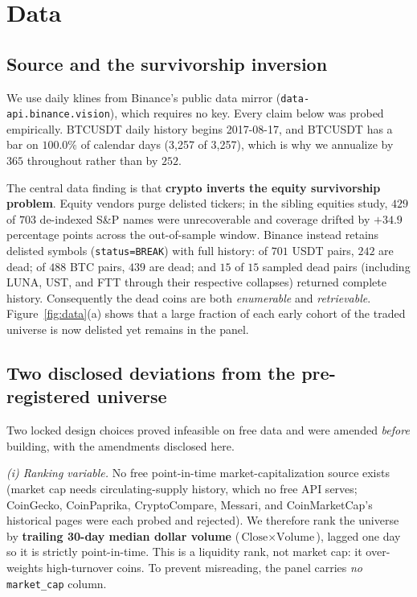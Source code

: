 \documentclass[11pt]{article}
\begin{document}
\section{Data}

\subsection{Source and the survivorship inversion}
We use daily klines from Binance's public data mirror (\texttt{data-api.binance.vision}), which
requires no key. Every claim below was probed empirically. BTCUSDT daily history begins
2017-08-17, and BTCUSDT has a bar on $100.0\%$ of calendar days (3{,}257 of 3{,}257), which is why
we annualize by $365$ throughout rather than by $252$.

The central data finding is that \textbf{crypto inverts the equity survivorship problem}. Equity
vendors purge delisted tickers; in the sibling equities study, $429$ of $703$ de-indexed S\&P names
were unrecoverable and coverage drifted by $+34.9$ percentage points across the out-of-sample
window. Binance instead retains delisted symbols (\texttt{status=BREAK}) with full history: of $701$
USDT pairs, $242$ are dead; of $488$ BTC pairs, $439$ are dead; and $15$ of $15$ sampled dead pairs
(including LUNA, UST, and FTT through their respective collapses) returned complete history.
Consequently the dead coins are both \emph{enumerable} and \emph{retrievable}.
Figure~\ref{fig:data}(a) shows that a large fraction of each early cohort of the traded universe is
now delisted yet remains in the panel.

\subsection{Two disclosed deviations from the pre-registered universe}
Two locked design choices proved infeasible on free data and were amended \emph{before} building,
with the amendments disclosed here.

\emph{(i) Ranking variable.} No free point-in-time market-capitalization source exists (market cap
needs circulating-supply history, which no free API serves; CoinGecko, CoinPaprika, CryptoCompare,
Messari, and CoinMarketCap's historical pages were each probed and rejected). We therefore rank the
universe by \textbf{trailing 30-day median dollar volume} ($\text{Close}\times\text{Volume}$),
lagged one day so it is strictly point-in-time. This is a liquidity rank, not market cap: it
over-weights high-turnover coins. To prevent misreading, the panel carries \emph{no}
\texttt{market\_cap} column.
\end{document}

